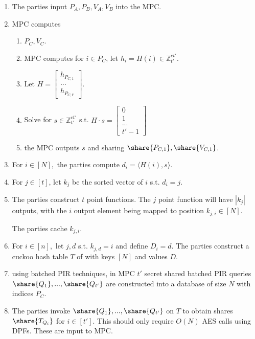 \begin{enumerate}
    \item The parties input $P_A,P_B,V_A,V_B$ into the MPC.
    \item MPC computes 
    \begin{enumerate}
        \item $P_C,V_C$.
    \item MPC computes for $i\in P_C$, let $h_i=H(i)\in \mathbb{Z}_{t'}^{ct'}$.
    \item Let $H=\begin{bmatrix}
        h_{P_{C,1}}\\
        ...\\
        h_{P_{C,t'}}
    \end{bmatrix}$.
    \item Solve for $s\in \mathbb{Z}_{t'}^{ct'}$ s.t. 
    $
        H\cdot s = \begin{bmatrix}
            0\\
            1\\
            ...\\
            t'-1
        \end{bmatrix}
    $
    \item the MPC outputs $s$ and sharing $\share{P_{C,1}},\share{V_{C,1}}$.
    \end{enumerate}
    \item For $i\in [N],$ the parties compute $d_i=\langle H(i), s\rangle$.
    \item For $j\in[t]$, let $k_j$ be the sorted vector of $i$ s.t. $d_i=j$.
    \item The parties construct $t$ point functions. The $j$ point function will have $|k_j|$ outputs, with the $i$ output element being mapped to position $k_{j,i}\in [N].$

    The parties cache $k_{j,i}$.

    \item For $i\in [n],$ let $j,d$ s.t. $k_{j,d}=i$ and define $D_i={d}$. The parties construct a cuckoo hash table $T$ of with keys $[N]$ and values $D$.

    \item using batched PIR techniques, in MPC $t'$ secret shared batched PIR queries $\share{Q_1},...,\share{Q_{t'}}$ are constructed  into a database of size $N$ with indices $P_C$.

    \item The parties invoke $\share{Q_1},...,\share{Q_{t'}}$ on $T$ to obtain shares $\share{T_{Q_i}}$ for $i\in [t']$. This should only require $O(N)$ AES calls using DPFs. These are input to MPC.


\end{enumerate}
